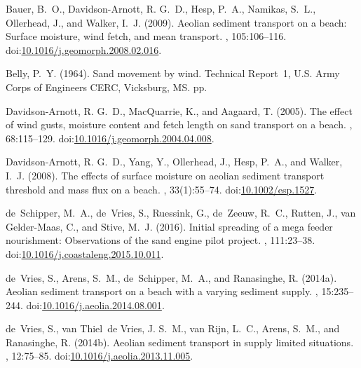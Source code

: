 \documentclass[preprint,12pt,authoryear,a4paper]{elsarticle}
\begin{document}
\begin{thebibliography}{}
Bauer, B.~O., Davidson-Arnott, R. G.~D., Hesp, P.~A., Namikas, S.~L.,
  Ollerhead, J., and Walker, I.~J. (2009).
\newblock Aeolian sediment transport on a beach: Surface moisture, wind fetch,
  and mean transport.
, 105:106--116.
\newblock
  doi:\href{http://dx.doi.org/10.1016/j.geomorph.2008.02.016}{10.1016/j.geomorph.2008.02.016}.

Belly, P.~Y. (1964).
\newblock Sand movement by wind.
\newblock Technical Report~1, U.S. Army Corps of Engineers CERC, Vicksburg, MS.
 pp.

Davidson-Arnott, R. G.~D., MacQuarrie, K., and Aagaard, T. (2005).
\newblock The effect of wind gusts, moisture content and fetch length on sand
  transport on a beach.
, 68:115--129.
\newblock
  doi:\href{http://dx.doi.org/10.1016/j.geomorph.2004.04.008}{10.1016/j.geomorph.2004.04.008}.

Davidson-Arnott, R. G.~D., Yang, Y., Ollerhead, J., Hesp, P.~A., and Walker,
  I.~J. (2008).
\newblock The effects of surface moisture on aeolian sediment transport
  threshold and mass flux on a beach.
, 33(1):55--74.
\newblock doi:\href{http://dx.doi.org/10.1002/esp.1527}{10.1002/esp.1527}.

de~Schipper, M.~A., de~Vries, S., Ruessink, G., de~Zeeuw, R.~C., Rutten, J.,
  van Gelder-Maas, C., and Stive, M.~J. (2016).
\newblock Initial spreading of a mega feeder nourishment: Observations of the
  sand engine pilot project.
, 111:23--38.
\newblock
  doi:\href{http://dx.doi.org/10.1016/j.coastaleng.2015.10.011}{10.1016/j.coastaleng.2015.10.011}.

de~Vries, S., Arens, S.~M., de~Schipper, M.~A., and Ranasinghe, R. (2014a).
\newblock Aeolian sediment transport on a beach with a varying sediment supply.
, 15:235--244.
\newblock
  doi:\href{http://dx.doi.org/10.1016/j.aeolia.2014.08.001}{10.1016/j.aeolia.2014.08.001}.

de~Vries, S., van Thiel~de Vries, J. S.~M., van Rijn, L.~C., Arens, S.~M., and
  Ranasinghe, R. (2014b).
\newblock Aeolian sediment transport in supply limited situations.
, 12:75--85.
\newblock
  doi:\href{http://dx.doi.org/10.1016/j.aeolia.2013.11.005}{10.1016/j.aeolia.2013.11.005}.


\end{thebibliography}
\end{document}

